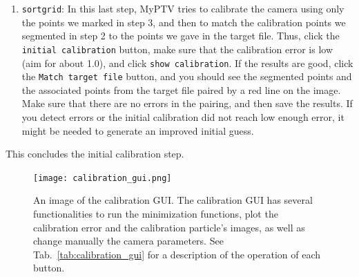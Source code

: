 \documentclass[10pt,a4paper]{article}
\begin{document}
\begin{enumerate}
	\item \texttt{sortgrid}: In this last step, MyPTV tries to calibrate the camera using only the points we marked in step 3, and then to match the calibration points we segmented in step 2 to the points we gave in the target file. Thus, click the \texttt{initial calibration} button, make sure that the calibration error is low (aim for about 1.0), and click \texttt{show calibration}. If the results are good, click the \texttt{Match target file} button, and you should see the segmented points and the associated points from the target file paired by a red line on the image. Make sure that there are no errors in the pairing, and then save the results. If you detect errors or the initial calibration did not reach low enough error, it might be needed to generate an improved initial guess.  
		 
\end{enumerate}
 
This concludes the initial calibration step.






\begin{figure}
	\centering
	\texttt{[image: calibration\_gui.png]}
	\caption{An image of the calibration GUI. The calibration GUI has several functionalities to run the minimization functions, plot the calibration error and the calibration particle's images, as well as change manually the camera parameters. See Tab.~\ref{tab:calibration_gui} for a description of the operation of each button. \label{fig:calibration_gui}}
\end{figure}
\end{document}
